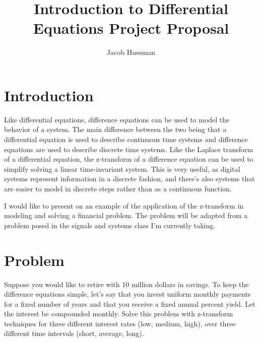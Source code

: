 \documentclass[letterpaper]{article}
\title{Introduction to Differential Equations Project Proposal}
\author{Jacob Huesman}
\begin{document}
\maketitle

\section{Introduction}
Like differential equations, difference equations can be used to model the behavior of a system. The main difference between the two being that a differential equation is used to describe continuous time systems and difference equations are used to describe discrete time systems. Like the Laplace transform of a differential equation, the z-transform of a difference equation can be used to simplify solving a linear time-invariant system. This is very useful, as digital systems represent information in a discrete fashion, and there's also systems that are easier to model in discrete steps rather than as a continuous function.

I would like to present on an example of the application of the z-transform in modeling and solving a financial problem. The problem will be adapted from a problem posed in the signals and systems class I'm currently taking.

\section{Problem}
Suppose you would like to retire with 10 million dollars in savings. To keep the difference equations simple, let's say that you invest uniform monthly payments for a fixed number of years and that you receive a fixed annual percent yield. Let the interest be compounded monthly. Solve this problem with z-transform techniques for three different interest rates (low, medium, high), over three different time intervals (short, average, long).
\end{document}
